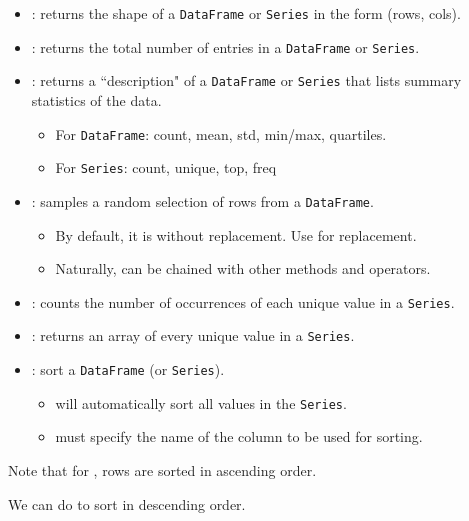 \documentclass[openany]{book}
\begin{document}
\begin{itemize}
	\item {}: returns the shape of a \texttt{DataFrame} or \texttt{Series} in the form (rows, cols).
	\item {}: returns the total number of entries in a \texttt{DataFrame} or \texttt{Series}.
	\item {}: returns a ``description" of a \texttt{DataFrame} or \texttt{Series} that lists summary statistics of the data.
	\begin{itemize}
		\item For \texttt{DataFrame}: count, mean, std, min/max, quartiles.
		\item For \texttt{Series}: count, unique, top, freq
	\end{itemize}
	\item {}: samples a random selection of rows from a \texttt{DataFrame}.
	\begin{itemize}
		\item By default, it is without replacement. Use  for replacement.
		\item Naturally, can be chained with other methods and operators.
	\end{itemize}
	\item {}: counts the number of occurrences of each unique value in a \texttt{Series}.
	\item {}: returns an array of every unique value in a \texttt{Series}.
	\item {}: sort a \texttt{DataFrame} (or \texttt{Series}).
	\begin{itemize}
		\item {} will automatically sort all values in the \texttt{Series}.
		\item {} must specify the name of the column to be used for sorting.
	\end{itemize}
\end{itemize}
\begin{warn}
	Note that for , rows are sorted in ascending order.
	
	We can do  to sort in descending order.
\end{warn}
\end{document}
